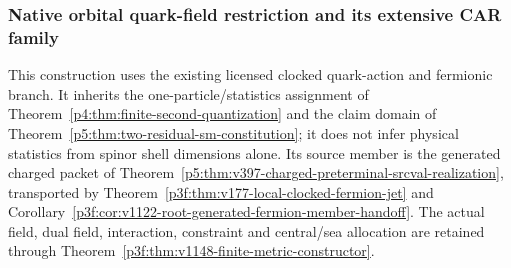 \documentclass[12pt,a4paper]{article}
\begin{document}



\subsubsection{Native orbital quark-field restriction and its extensive CAR family}
\label{p10:sec:v2189-native-spatial-quark-constructor}

This construction uses the existing licensed clocked quark-action and
fermionic branch. It inherits the one-particle/statistics assignment of
Theorem~\ref{p4:thm:finite-second-quantization} and the claim domain of
Theorem~\ref{p5:thm:two-residual-sm-constitution}; it does not infer physical
statistics from spinor shell dimensions alone. Its source member is the
generated charged packet of
Theorem~\ref{p5:thm:v397-charged-preterminal-srcval-realization}, transported
by Theorem~\ref{p3f:thm:v177-local-clocked-fermion-jet} and
Corollary~\ref{p3f:cor:v1122-root-generated-fermion-member-handoff}.
The actual field, dual field, interaction, constraint and central/sea
allocation are retained through
Theorem~\ref{p3f:thm:v1148-finite-metric-constructor}.
\end{document}
